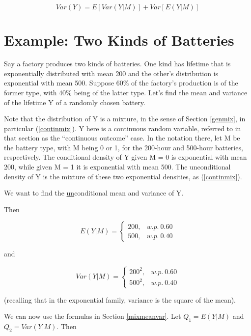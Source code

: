 \begin{equation}
\label{mixvar}
Var(Y) = E[Var(Y|M)] + Var[E(Y|M)]
\end{equation}

\section{Example:  Two Kinds of Batteries}

Say a factory produces two kinds of batteries.  One kind has lifetime
that is exponentially distributed with mean 200 and the other's
distribution is exponential with mean 500.  Suppose 60\% of the
factory's production is of the former type, with 40\% being of the
latter type.  Let's find the mean and variance of the lifetime Y of a
randomly chosen battery.

Note that the distribution of Y is a mixture, in the sense of Section
\ref{genmix}, in particular (\ref{continmix}).  Y here is a continuous
random variable, referred to in that section as the ``continuous
outcome'' case.   In the notation there, let M be the battery type, with
M being 0 or 1, for the 200-hour and 500-hour batteries, respectively.
The conditional density of Y given M = 0 is exponential with mean 200,
while given M = 1 it is exponential with mean 500.  The unconditional
density of Y is the mixture of these two exponential densities, as 
(\ref{continmix}).

We want to find the \underline{un}conditional mean and variance of Y.

Then

\begin{equation}
\label{batt1}
E(Y|M)=\left\{ \begin{array}{rl}
200, & w.p. ~ 0.60 \\
500, & w.p. ~ 0.40
\end{array}\right. 
\end{equation}

and 

\begin{equation}
\label{batt2}
Var(Y|M)=\left\{ \begin{array}{rl}
200^2, & w.p. ~ 0.60 \\
500^2, & w.p. ~ 0.40
\end{array}\right. 
\end{equation}

(recalling that in the exponential family, variance is the square of the
mean).

We can now use the formulas in Section \ref{mixmeanvar}.  Let $Q_1 =
E(Y|M)$  and $Q_2 = Var(Y|M)$.  Then

